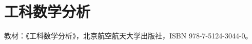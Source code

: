 \chapter{工科数学分析}

教材：《工科数学分析》，北京航空航天大学出版社，ISBN 978-7-5124-3044-0。





































































